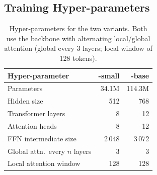 \documentclass[11pt,a4paper]{article}
\begin{document}
\begin{appendices}

\clearpage
\section{Training Hyper-parameters}%
\label{app:training-details}

\begin{table}[htbp]
  \centering
  \small
  \begin{tabular}{lrr}
    \toprule
    \textbf{Hyper-parameter}
      & \textbf{\model{}-small}
      & \textbf{\model{}-base} \\
    \midrule
    Parameters                 & 34.1M   & 114.3M  \\
    Hidden size                & 512     & 768     \\
    Transformer layers         & 8       & 12      \\
    Attention heads            & 8       & 12      \\
    FFN intermediate size      & 2\,048  & 3\,072  \\
    Global attn.\ every $n$ layers & 3   & 3       \\
    Local attention window     & 128     & 128     \\
    \bottomrule
  \end{tabular}
  \caption{%
    Hyper-parameters for the two \model{} variants.
    Both use the \modernbert{} backbone with alternating local/global
    attention (global every 3 layers; local window of 128 tokens).
  }%
  \label{tab:model-config}
\end{table}


\end{appendices}
\end{document}
